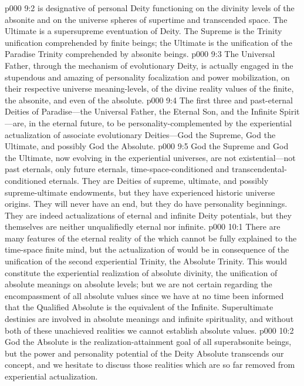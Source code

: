 \pc \vs p000 9:2  is designative of personal Deity functioning on the divinity levels of the absonite and on the universe spheres of supertime and transcended space. The Ultimate is a supersupreme eventuation of Deity. The Supreme is the Trinity unification comprehended by finite beings; the Ultimate is the unification of the Paradise Trinity comprehended by absonite beings.
\vs p000 9:3 The Universal Father, through the mechanism of evolutionary Deity, is actually engaged in the stupendous and amazing  of personality focalization and power mobilization, on their respective universe meaning\hyp{}levels, of the divine reality values of the finite, the absonite, and even of the absolute.\plusone
\vs p000 9:4 The first three and past\hyp{}eternal Deities of Paradise---the Universal Father, the Eternal Son, and the Infinite Spirit---are, in the eternal future, to be personality\hyp{}complemented by the experiential actualization of associate evolutionary Deities---God the Supreme, God the Ultimate, and possibly God the Absolute.
\pc \vs p000 9:5 God the Supreme and God the Ultimate, now evolving in the experiential universes, are not existential---not past eternals, only future eternals, time\hyp{}space\hyp{}conditioned and transcendental\hyp{}conditioned eternals. They are Deities of supreme, ultimate, and possibly supreme\hyp{}ultimate endowments, but they have experienced historic universe origins. They will never have an end, but they do have personality beginnings. They are indeed actualizations of eternal and infinite Deity potentials, but they themselves are neither unqualifiedly eternal nor infinite.
\vs p000 10:1 There are many features of the eternal reality of the  which cannot be fully explained to the time\hyp{}space finite mind, but the actualization of  would be in consequence of the unification of the second experiential Trinity, the Absolute Trinity. This would constitute the experiential realization of absolute divinity, the unification of absolute meanings on absolute levels; but we are not certain regarding the encompassment of all absolute values since we have at no time been informed that the Qualified Absolute is the equivalent of the Infinite. Superultimate destinies are involved in absolute meanings and infinite spirituality, and without both of these unachieved realities we cannot establish absolute values.
\vs p000 10:2 God the Absolute is the realization\hyp{}attainment goal of all superabsonite beings, but the power and personality potential of the Deity Absolute transcends our concept, and we hesitate to discuss those realities which are so far removed from experiential actualization.\plusone
